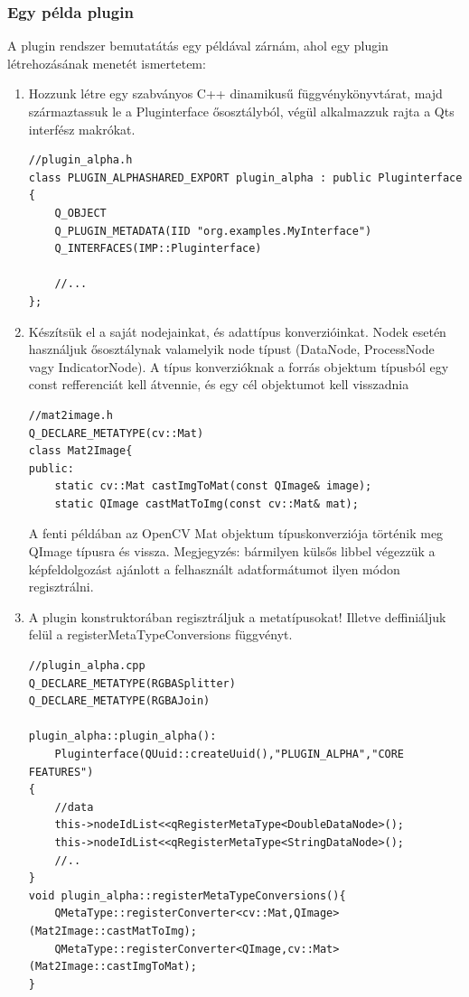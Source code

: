 \documentclass[a4paper,12pt,oneside]{report}
\begin{document}
\subsubsection{Egy példa plugin}
A plugin rendszer bemutatátás egy példával zárnám, ahol egy plugin létrehozásának menetét ismertetem:
\begin{enumerate}
\itemsep0em
\item Hozzunk létre egy szabványos C++ dinamikusű függvénykönyvtárat, majd származtassuk le a Pluginterface ősosztályból, végül alkalmazzuk rajta a Qts interfész makrókat.
\begin{lstlisting}
//plugin_alpha.h
class PLUGIN_ALPHASHARED_EXPORT plugin_alpha : public Pluginterface
{
    Q_OBJECT
    Q_PLUGIN_METADATA(IID "org.examples.MyInterface")
    Q_INTERFACES(IMP::Pluginterface)

    //...
};
\end{lstlisting}
\item Készítsük el a saját nodejainkat, és adattípus konverzióinkat. Nodek esetén használjuk ősosztálynak valamelyik node típust (DataNode, ProcessNode vagy IndicatorNode). A típus konverzióknak a forrás objektum típusból egy const refferenciát kell átvennie, és egy cél objektumot kell visszadnia
\begin{lstlisting}
//mat2image.h
Q_DECLARE_METATYPE(cv::Mat)
class Mat2Image{
public:
    static cv::Mat castImgToMat(const QImage& image);
    static QImage castMatToImg(const cv::Mat& mat);
\end{lstlisting}
A fenti példában az OpenCV Mat objektum típuskonverziója történik meg QImage típusra és vissza. Megjegyzés: bármilyen külsős libbel végezzük a képfeldolgozást ajánlott a felhasznált adatformátumot ilyen módon regisztrálni.

\item A plugin konstruktorában regisztráljuk a metatípusokat! Illetve deffiniáljuk felül a registerMetaTypeConversions függvényt.
\begin{lstlisting}
//plugin_alpha.cpp
Q_DECLARE_METATYPE(RGBASplitter)
Q_DECLARE_METATYPE(RGBAJoin)

plugin_alpha::plugin_alpha():
    Pluginterface(QUuid::createUuid(),"PLUGIN_ALPHA","CORE FEATURES")
{
    //data
    this->nodeIdList<<qRegisterMetaType<DoubleDataNode>();
    this->nodeIdList<<qRegisterMetaType<StringDataNode>();
    //..
}
void plugin_alpha::registerMetaTypeConversions(){
    QMetaType::registerConverter<cv::Mat,QImage>(Mat2Image::castMatToImg);
    QMetaType::registerConverter<QImage,cv::Mat>(Mat2Image::castImgToMat);
}

\end{lstlisting}
\end{enumerate}
\end{document}
